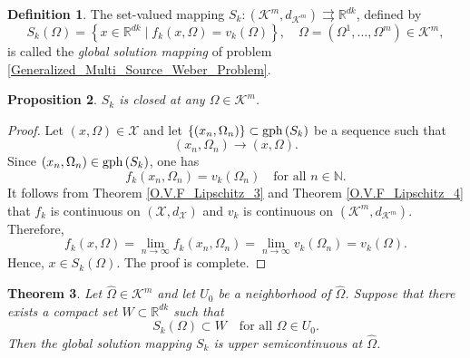 \documentclass[sn-mathphys-num]{sn-jnl}%
\def\Hat{\widehat}
\def\gph{\mbox{\rm gph}\,}
\newtheorem{theorem}{Theorem}[section]
\newtheorem{proposition}[theorem]{Proposition}
\theoremstyle{definition}
\newtheorem{definition}[theorem]{Definition}
\begin{document}
\begin{definition}
	\label{G.S.Mapping_1}
	The set-valued mapping $S_k:(\mathcal{K}^m,d_{\mathcal{K}^m})
	\rightrightarrows \mathbb{R}^{dk}$, defined by
	\begin{equation}
		\label{g.l.b_S_k_definition}
		S_k(\Omega)=\left\{x\in\mathbb{R}^{dk}\mid f_k(x,\Omega)=v_k(\Omega)\right\},
		\quad \Omega=(\Omega^1,\dots,\Omega^m)\in\mathcal{K}^m,
	\end{equation}
	is called the \textit{global solution mapping} of problem
	\eqref{Generalized_Multi_Source_Weber_Problem}.
\end{definition}



\begin{proposition}
	\label{G.S.Mapping_3}
	$S_k$ is closed at any $\Omega\in \mathcal{K}^m$. 
\end{proposition}


\begin{proof}
	Let $(x,\Omega)\in\mathcal X$ and let $\{(x_n,\Omega_n)\}\subset \gph(S_k)$ be a sequence such that
	\[
	(x_n,\Omega_n)\longrightarrow{}(x,\Omega).
	\]
	Since $(x_n,\Omega_n)\in \gph(S_k)$, one has
	\[
	f_k(x_n,\Omega_n)=v_k(\Omega_n)\quad \text{for all } n\in\mathbb N.
	\]
	It follows from Theorem \ref{O.V.F_Lipschitz_3} and Theorem \ref{O.V.F_Lipschitz_4} that
	$f_k$ is continuous on $(\mathcal X,d_{\mathcal X})$ and $v_k$ is continuous on
	$(\mathcal K^m,d_{\mathcal K^m})$. Therefore,
	\[
	f_k(x,\Omega)
	=\lim_{n\to\infty} f_k(x_n,\Omega_n)
	=\lim_{n\to\infty} v_k(\Omega_n)
	=v_k(\Omega).
	\]
	Hence, $x\in S_k(\Omega)$. The proof is complete.
\end{proof}





\begin{theorem}
	\label{G.S.Mapping_4}
	Let $\Hat\Omega\in \mathcal{K}^m$ and let $U_0$ be a neighborhood of $\Hat\Omega$. Suppose that there exists a compact set $W\subset \mathbb{R}^{dk}$ such that
	\[
	S_k(\Omega)\subset W \quad \text{for all } \Omega\in U_0.
	\]
	Then the global solution mapping $S_k$ is upper semicontinuous at $\Hat\Omega$.
\end{theorem}
\end{document}
